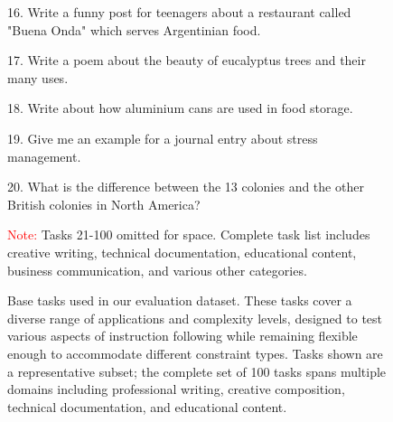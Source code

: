 \begin{figure*}[h]
\begin{tcolorbox}[colframe=white, left=3mm, right=3mm]
16. Write a funny post for teenagers about a restaurant called "Buena Onda" which serves Argentinian food.

17. Write a poem about the beauty of eucalyptus trees and their many uses.

18. Write about how aluminium cans are used in food storage.

19. Give me an example for a journal entry about stress management.

20. What is the difference between the 13 colonies and the other British colonies in North America?

    \textcolor{red}{Note:} Tasks 21-100 omitted for space. Complete task list includes creative writing, technical documentation, educational content, business communication, and various other categories.
    \end{tcolorbox}
    \caption{Base tasks used in our evaluation dataset. These tasks cover a diverse range of applications and complexity levels, designed to test various aspects of instruction following while remaining flexible enough to accommodate different constraint types. Tasks shown are a representative subset; the complete set of 100 tasks spans multiple domains including professional writing, creative composition, technical documentation, and educational content.}
    \label{fig:base_tasks}
\end{figure*}